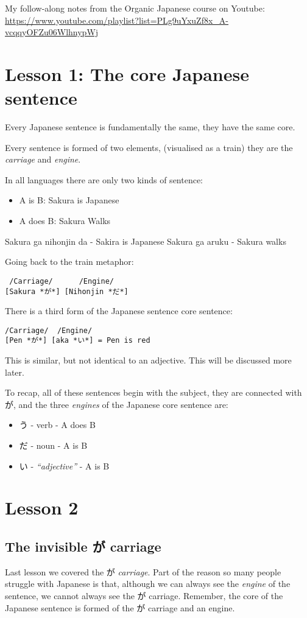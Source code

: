 \documentclass[11pt]{article}
\author{Jordan Cross}
\date{\today}
\title{}
\begin{document}
\tableofcontents

My follow-along notes from the Organic Japanese course on Youtube: \url{https://www.youtube.com/playlist?list=PLg9uYxuZf8x\_A-vcqqyOFZu06WlhnypWj}
\section{Lesson 1: The core Japanese sentence}
\label{sec:org60b2fdb}
Every Japanese sentence is fundamentally the same, they have the same core.

Every sentence is formed of two elements, (visualised as a train) they are the \emph{carriage} and \emph{engine}.

In all languages there are only two kinds of sentence:
\begin{itemize}
\item A is B: Sakura is Japanese
\item A does B: Sakura Walks
\end{itemize}

Sakura ga nihonjin da - Sakira is Japanese
Sakura ga aruku - Sakura walks

Going back to the train metaphor:
\begin{verbatim}
 /Carriage/      /Engine/
[Sakura *が*] [Nihonjin *だ*]
\end{verbatim}

There is a third form of the Japanese sentence core sentence:
\begin{verbatim}
/Carriage/  /Engine/
[Pen *が*] [aka *い*] = Pen is red
\end{verbatim}

This is similar, but not identical to an adjective. This will be discussed more later.

To recap, all of these sentences begin with the subject, they are connected with が, and the three \emph{engines} of the Japanese core sentence are:
\begin{itemize}
\item う - verb          - A does B
\item だ - noun          - A is B
\item い - \emph{``adjective''} - A is B
\end{itemize}

\section{Lesson 2}
\label{sec:org8f32da1}
\subsection{The invisible が carriage}
\label{sec:org94fa6e8}
Last lesson we covered the が \emph{carriage}. Part of the reason so many people struggle with Japanese is that, although we can always see the \emph{engine} of the sentence, we cannot always see the が carriage. Remember, the core of the Japanese sentence is formed of the が carriage and an engine.
\end{document}
